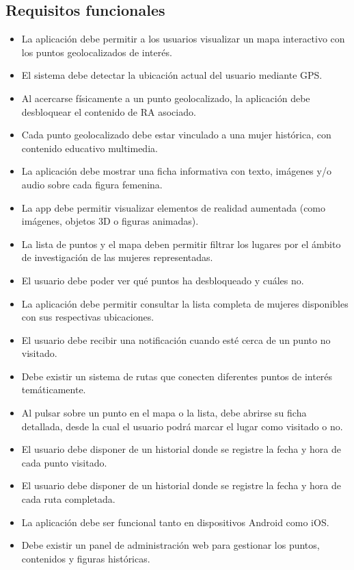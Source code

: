 \subsection{Requisitos funcionales}
\begin{itemize}
\item[RF1:] La aplicación debe permitir a los usuarios visualizar un mapa interactivo con los puntos geolocalizados de interés.
\item[RF2:] El sistema debe detectar la ubicación actual del usuario mediante GPS.
\item[RF3:] Al acercarse físicamente a un punto geolocalizado, la aplicación debe desbloquear el contenido de RA asociado.
\item[RF4:] Cada punto geolocalizado debe estar vinculado a una mujer histórica, con contenido educativo multimedia.
\item[RF5:] La aplicación debe mostrar una ficha informativa con texto, imágenes y/o audio sobre cada figura femenina.
\item[RF6:] La app debe permitir visualizar elementos de realidad aumentada (como imágenes, objetos 3D o figuras animadas).
\item[RF7:] La lista de puntos y el mapa deben permitir filtrar los lugares por el ámbito de investigación de las mujeres representadas.
\item[RF8:] El usuario debe poder ver qué puntos ha desbloqueado y cuáles no.
\item[RF9:] La aplicación debe permitir consultar la lista completa de mujeres disponibles con sus respectivas ubicaciones.
\item[RF10:] El usuario debe recibir una notificación cuando esté cerca de un punto no visitado.
\item[RF11:] Debe existir un sistema de rutas que conecten diferentes puntos de interés temáticamente.
\item[RF12:] Al pulsar sobre un punto en el mapa o la lista, debe abrirse su ficha detallada, desde la cual el usuario podrá marcar el lugar como visitado o no.
\item[RF13:] El usuario debe disponer de un historial donde se registre la fecha y hora de cada punto visitado.
\item[RF14:] El usuario debe disponer de un historial donde se registre la fecha y hora de cada ruta completada.
\item[RF15:] La aplicación debe ser funcional tanto en dispositivos Android como iOS.
\item[RF16:] Debe existir un panel de administración web para gestionar los puntos, contenidos y figuras históricas.

\end{itemize}
